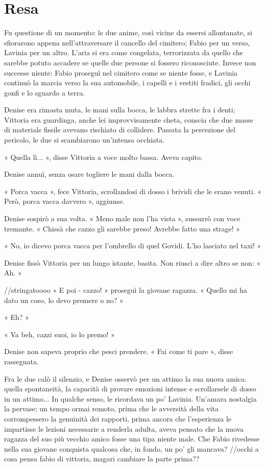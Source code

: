 \chapter{Resa}

Fu questione di un momento: le due anime, così vicine da essersi allontanate, si sfiorarono appena nell'attraversare il cancello del cimitero; Fabio per un verso, Lavinia per un altro. L'aria si era come congelata, terrorizzata da quello che sarebbe potuto accadere se quelle due persone si fossero riconosciute. Invece non successe niente: Fabio proseguì nel cimitero come se niente fosse, e Lavinia continuò la marcia verso la sua automobile, i capelli e i vestiti fradici, gli occhi gonfi e lo sguardo a terra.

Denise era rimasta muta, le mani sulla bocca, le labbra strette fra i denti; Vittoria era guardinga, anche lei improvvisamente cheta, conscia che due masse di materiale fissile avevano rischiato di collidere. Passata la percezione del pericolo, le due si scambiarono un'intensa occhiata.

« Quella lì... », disse Vittoria a voce molto bassa. Aveva capito.

Denise annuì, senza osare togliere le mani dalla bocca.

« Porca vacca », fece Vittoria, scrollandosi di dosso i brividi che le erano venuti. « Però, porca vacca davvero », aggiunse.

Denise sospirò a sua volta. « Meno male non l'ha vista », sussurrò con voce tremante. « Chissà che cazzo gli sarebbe preso! Avrebbe fatto una strage! »

« No, io dicevo porca vacca per l'ombrello di quel Govidi. L'ho lasciato nel taxi! »

Denise fissò Vittoria per un lungo istante, basita. Non riuscì a dire altro se non: « Ah. »

//stringatoooo
« E poi - cazzo! » proseguì la giovane ragazza. « Quello mi ha dato un coso, lo devo premere o no? »

« Eh? »

« Va beh, cazzi suoi, io lo premo! »

Denise non sapeva proprio che pesci prendere. « Fai come ti pare », disse rassegnata.

Fra le due calò il silenzio, e Denise osservò per un attimo la sua nuova amica: quella spontaneità, la capacità di provare emozioni intense e scrollarsele di dosso in un attimo... In qualche senso, le ricordava un po' Lavinia. Un'amara nostalgia la pervase; un tempo ormai remoto, prima che le avversità della vita corrompessero la genuinità dei rapporti, prima ancora che l'esperienza le impartisse le lezioni necessarie a renderla adulta, aveva pensato che la nuova ragazza del suo più vecchio amico fosse una tipa niente male. Che Fabio rivedesse nella sua giovane conquista qualcosa che, in fondo, un po' gli mancava?
//occhi a cosa pensa fabio di vittoria, magari cambiare la parte prima??


